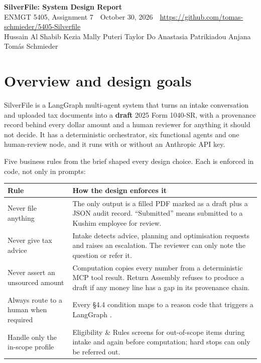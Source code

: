 \documentclass[9pt]{extarticle}
\newcommand{\code}[1]{\texttt{\detokenize{#1}}}
\begin{document}
\begin{center}
{\LARGE\bfseries SilverFile: System Design Report}\\[4pt]
ENMGT 5405, Assignment 7 \,\textperiodcentered\, October 30, 2026 \,\textperiodcentered\, \url{https://github.com/tomas-schmieder/5405-Silverfile} \\[2pt]
{\small Hussain Al Shabib \quad Kezia Mally Puteri \quad Taylor Do \quad Anastasia Patrikiadou \quad Anjana \quad Tom\'as Schmieder}
\end{center}

\section{Overview and design goals}

SilverFile is a LangGraph multi-agent system that turns an intake conversation and uploaded tax documents into a \textbf{draft} 2025 Form 1040-SR, with a provenance record behind every dollar amount and a human reviewer for anything it should not decide. It has a deterministic orchestrator, six functional agents and one human-review node, and it runs with or without an Anthropic API key.

Five business rules from the brief shaped every design choice. Each is enforced in code, not only in prompts:

\begin{xltabular}{\linewidth}{@{}P{4.2cm}L@{}}
\toprule
\textbf{Rule} & \textbf{How the design enforces it} \\
\midrule
Never file anything & The only output is a filled PDF marked as a draft plus a JSON audit record. ``Submitted'' means submitted to a Kushim employee for review. \\
Never give tax advice & Intake detects advice, planning and optimisation requests and raises an \code{advice_request} escalation. The reviewer can only note the question or refer it. \\
Never assert an unsourced amount & Computation copies every number from a deterministic MCP tool result. Return Assembly refuses to produce a draft if any money line has a gap in its provenance chain. \\
Always route to a human when required & Every \S4.4 condition maps to a reason code that triggers a LangGraph \code{interrupt}. \\
Handle only the in-scope profile & Eligibility \& Rules screens for out-of-scope items during intake and again before computation; hard stops can only be referred out. \\
\bottomrule
\end{xltabular}
\end{document}
